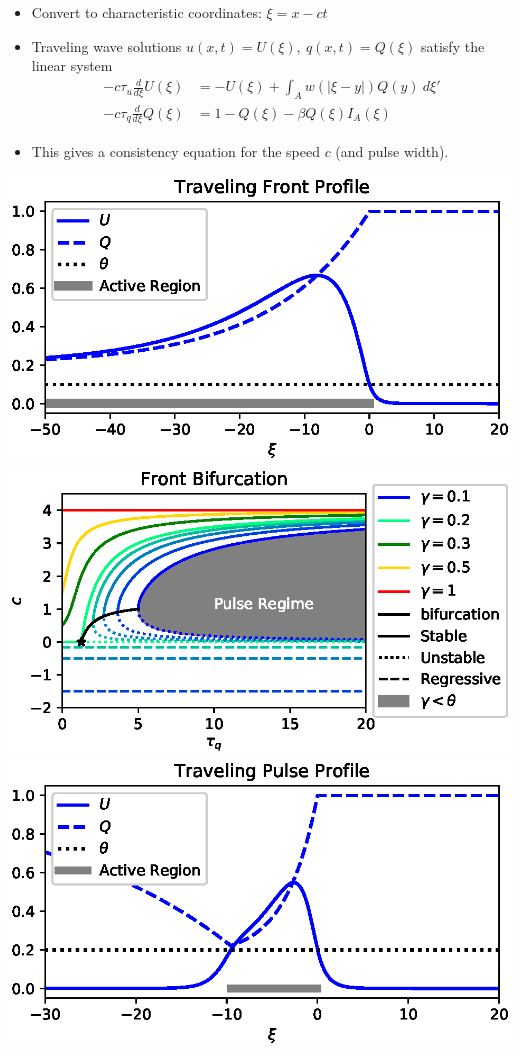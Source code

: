 \documentclass[landscape,final]{baposter}
\begin{document}
\begin{poster}
{}
{
	\begin{itemize}
		\item Convert to characteristic coordinates: $\xi = x - c t$
		\item Traveling wave solutions $u(x,t) = U(\xi), \ q(x,t) = Q(\xi)$ satisfy the linear system
			\begin{align*}
				-c\tau_u \frac{d}{d \xi} U(\xi) &= -U(\xi) + \int_A w(|\xi - y|) Q(y) \ d\xi' \\
				-c \tau_q \frac{d}{d \xi} Q(\xi) &= 1 - Q(\xi) - \beta Q(\xi) I_A(\xi)
			\end{align*}
		\item This gives a consistency equation for the speed $c$ (and pulse width).
	\end{itemize}
	\begin{center}
		\includegraphics[width=.9\linewidth, trim={0cm, .2cm, 0cm, 0cm}, clip=true]{front_profile}
		\includegraphics[width=.9\linewidth, trim={0cm, .2cm, 0cm, 0cm}, clip=true]{front_bifurcation}
		\includegraphics[width=.9\linewidth, trim={0cm, .2cm, 0cm, 0cm}, clip=true]{pulse_profile}

\end{center}}
\end{poster}
\end{document}
